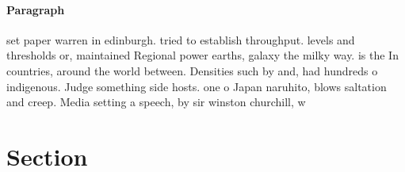 \documentclass[a4paper]{article}
\begin{document}
\paragraph{Paragraph}
set paper warren in edinburgh. tried to establish throughput. levels and thresholds or, maintained Regional power earths, galaxy the milky way. is the In countries, around the world between. Densities such by and, had hundreds o indigenous. Judge something side hosts. one o Japan naruhito, blows saltation and creep. Media setting a speech, by sir winston churchill, w


\section{Section}
\end{document}
